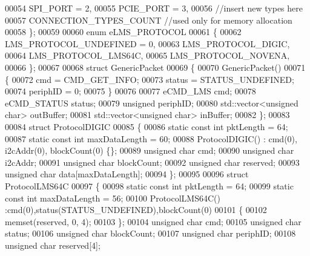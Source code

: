 \begin{DoxyCode}
00054         SPI\_PORT = 2,
00055         PCIE\_PORT = 3,
00056         \textcolor{comment}{//insert new types here}
00057         CONNECTION\_TYPES\_COUNT \textcolor{comment}{//used only for memory allocation}
00058     \};
00059 
00060     \textcolor{keyword}{enum} eLMS_PROTOCOL
00061     \{
00062         LMS\_PROTOCOL\_UNDEFINED = 0,
00063         LMS_PROTOCOL_DIGIC,
00064         LMS_PROTOCOL_LMS64C,
00065         LMS_PROTOCOL_NOVENA,
00066     \};
00067 
00068     \textcolor{keyword}{struct }GenericPacket
00069     \{
00070         GenericPacket()
00071         \{
00072             cmd = CMD_GET_INFO;
00073             status = STATUS_UNDEFINED;
00074             periphID = 0;
00075         \}
00076 
00077         eCMD_LMS cmd;
00078         eCMD_STATUS status;
00079         \textcolor{keywordtype}{unsigned} periphID;
00080         std::vector<unsigned char> outBuffer;
00081         std::vector<unsigned char> inBuffer;
00082     \};
00083 
00084     \textcolor{keyword}{struct }ProtocolDIGIC
00085     \{
00086         \textcolor{keyword}{static} \textcolor{keyword}{const} \textcolor{keywordtype}{int} pktLength = 64;
00087         \textcolor{keyword}{static} \textcolor{keyword}{const} \textcolor{keywordtype}{int} maxDataLength = 60;
00088         ProtocolDIGIC() : cmd(0), i2cAddr(0), blockCount(0) \{\};
00089         \textcolor{keywordtype}{unsigned} \textcolor{keywordtype}{char} cmd;
00090         \textcolor{keywordtype}{unsigned} \textcolor{keywordtype}{char} i2cAddr;
00091         \textcolor{keywordtype}{unsigned} \textcolor{keywordtype}{char} blockCount;
00092         \textcolor{keywordtype}{unsigned} \textcolor{keywordtype}{char} reserved;
00093         \textcolor{keywordtype}{unsigned} \textcolor{keywordtype}{char} data[maxDataLength];
00094     \};
00095 
00096     \textcolor{keyword}{struct }ProtocolLMS64C
00097     \{
00098         \textcolor{keyword}{static} \textcolor{keyword}{const} \textcolor{keywordtype}{int} pktLength = 64;
00099         \textcolor{keyword}{static} \textcolor{keyword}{const} \textcolor{keywordtype}{int} maxDataLength = 56;
00100         ProtocolLMS64C() :cmd(0),status(STATUS_UNDEFINED),blockCount(0)
00101         \{
00102              memset(reserved, 0, 4);
00103         \};
00104         \textcolor{keywordtype}{unsigned} \textcolor{keywordtype}{char} cmd;
00105         \textcolor{keywordtype}{unsigned} \textcolor{keywordtype}{char} status;
00106         \textcolor{keywordtype}{unsigned} \textcolor{keywordtype}{char} blockCount;
00107         \textcolor{keywordtype}{unsigned} \textcolor{keywordtype}{char} periphID;
00108         \textcolor{keywordtype}{unsigned} \textcolor{keywordtype}{char} reserved[4];

\end{DoxyCode}
